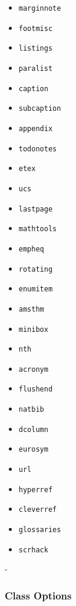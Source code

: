 \begin{itemize}
    \item \lstinline!marginnote!
    \item \lstinline!footmisc!
    \item \lstinline!listings!
    \item \lstinline!paralist!
    \item \lstinline!caption!
    \item \lstinline!subcaption!
    \item \lstinline!appendix!
    \item \lstinline!todonotes!
    \item \lstinline!etex!
    \item \lstinline!ucs!
    \item \lstinline!lastpage!
    \item \lstinline!mathtools!
    \item \lstinline!empheq!
    \item \lstinline!rotating!
    \item \lstinline!enumitem!
    \item \lstinline!amsthm!
    \item \lstinline!minibox!
    \item \lstinline!nth!
    \item \lstinline!acronym!
    \item \lstinline!flushend!
    \item \lstinline!natbib!
    \item \lstinline!dcolumn!
    \item \lstinline!eurosym!
    \item \lstinline!url!
    \item \lstinline!hyperref!
    \item \lstinline!cleverref!
    \item \lstinline!glossaries!
    \item \lstinline!scrhack!
\end{itemize}

-
\subsubsection{Class Options}

